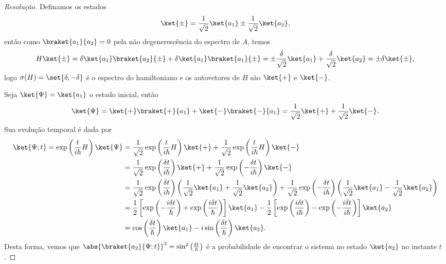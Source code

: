 \begin{proof}[Resolução]
    Definamos os estados
    \begin{equation*}
        \ket{\pm} = \frac1{\sqrt{2}} \ket{a_1} \pm \frac1{\sqrt{2}} \ket{a_2},
    \end{equation*}
    então como \(\braket{a_1}{a_2} = 0\) pela não degenerescência do espectro de \(A\), temos
    \begin{equation*}
        H\ket{\pm} = \delta \ket{a_1} \braket{a_2}{\pm} + \delta \ket{a_1} \braket{a_1}{\pm} = \pm\frac{\delta}{\sqrt{2}} \ket{a_1} + \frac{\delta}{\sqrt{2}}\ket{a_2} = \pm \delta \ket{\pm},
    \end{equation*}
    logo \(\sigma(H) = \set{\delta, -\delta}\) é o espectro do hamiltoniano e os autovetores de \(H\) são \(\ket{+}\) e \(\ket{-}\).

    Seja \(\ket{\Psi} = \ket{a_1}\) o estado inicial, então 
    \begin{equation*}
        \ket{\Psi} = \ket{+}\braket{+}{a_1} + \ket{-}\braket{-}{a_1} = \frac{1}{\sqrt{2}} \ket{+} + \frac{1}{\sqrt{2}}\ket{-}.
    \end{equation*}
    Sua evolução temporal é dada por
    \begin{align*}
        \ket{\Psi; t} = \exp\left(\frac{t}{i\hbar} H\right)\ket{\Psi} 
        &= \frac{1}{\sqrt{2}}\exp\left(\frac{t}{i\hbar} H\right)\ket{+} + \frac{1}{\sqrt{2}} \exp\left(\frac{t}{i \hbar} H\right)\ket{-}\\
        &= \frac{1}{\sqrt{2}} \exp\left(\frac{\delta t}{i \hbar}\right)\ket{+} + \frac{1}{\sqrt{2}} \exp\left(-\frac{\delta t}{i \hbar}\right)\ket{-}\\
        &= \frac{1}{\sqrt{2}} \exp\left(\frac{\delta t}{i \hbar}\right)\left(\frac1{\sqrt{2}}\ket{a_1} + \frac1{\sqrt{2}}\ket{a_2}\right) + \frac{1}{\sqrt{2}} \exp\left(-\frac{\delta t}{i \hbar}\right)\left(\frac1{\sqrt{2}}\ket{a_1} - \frac1{\sqrt{2}}\ket{a_2}\right)\\
        &= \frac12\left[\exp\left(-\frac{i\delta t}{\hbar}\right) + \exp\left(\frac{i\delta t}{\hbar}\right)\right]\ket{a_1} - \frac12\left[\exp\left(\frac{i \delta t}{i \hbar}\right) - \exp\left(-\frac{i \delta t}{i \hbar}\right)\right]\ket{a_2}\\
        &= \cos\left(\frac{\delta t}{\hbar}\right) \ket{a_1} - i \sin\left(\frac{\delta t}{\hbar}\right) \ket{a_2}.
    \end{align*}
    Desta forma, vemos que  \(\abs{\braket{a_2}{\Psi; t}}^2 = \sin^2\left(\frac{\delta t}{\hbar}\right)\) é a probabilidade de encontrar o sistema no estado \(\ket{a_2}\) no instante \(t\).
\end{proof}
